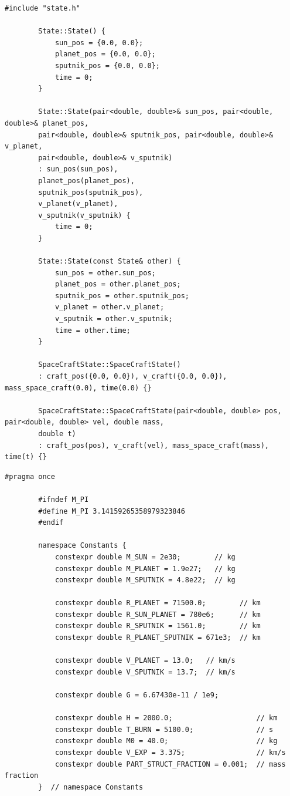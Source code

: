 \documentclass[14pt,a4paper]{extarticle}
\theoremstyle{plain}
\begin{document}
	\begin{lstlisting}[title=state.cpp, gobble=16, breaklines=true, breakatwhitespace=true]
		#include "state.h"
		
		State::State() {
			sun_pos = {0.0, 0.0};
			planet_pos = {0.0, 0.0};
			sputnik_pos = {0.0, 0.0};
			time = 0;
		}
		
		State::State(pair<double, double>& sun_pos, pair<double, double>& planet_pos,
		pair<double, double>& sputnik_pos, pair<double, double>& v_planet,
		pair<double, double>& v_sputnik)
		: sun_pos(sun_pos),
		planet_pos(planet_pos),
		sputnik_pos(sputnik_pos),
		v_planet(v_planet),
		v_sputnik(v_sputnik) {
			time = 0;
		}
		
		State::State(const State& other) {
			sun_pos = other.sun_pos;
			planet_pos = other.planet_pos;
			sputnik_pos = other.sputnik_pos;
			v_planet = other.v_planet;
			v_sputnik = other.v_sputnik;
			time = other.time;
		}
		
		SpaceCraftState::SpaceCraftState()
		: craft_pos({0.0, 0.0}), v_craft({0.0, 0.0}), mass_space_craft(0.0), time(0.0) {}
		
		SpaceCraftState::SpaceCraftState(pair<double, double> pos, pair<double, double> vel, double mass,
		double t)
		: craft_pos(pos), v_craft(vel), mass_space_craft(mass), time(t) {}
	\end{lstlisting}
	
	\begin{lstlisting}[title=consts.cpp, gobble=16, breaklines=true, breakatwhitespace=true]
		#pragma once
		
		#ifndef M_PI
		#define M_PI 3.14159265358979323846
		#endif
		
		namespace Constants {
			constexpr double M_SUN = 2e30;        // kg
			constexpr double M_PLANET = 1.9e27;   // kg
			constexpr double M_SPUTNIK = 4.8e22;  // kg
			
			constexpr double R_PLANET = 71500.0;        // km
			constexpr double R_SUN_PLANET = 780e6;      // km
			constexpr double R_SPUTNIK = 1561.0;        // km
			constexpr double R_PLANET_SPUTNIK = 671e3;  // km
			
			constexpr double V_PLANET = 13.0;   // km/s
			constexpr double V_SPUTNIK = 13.7;  // km/s
			
			constexpr double G = 6.67430e-11 / 1e9;
			
			constexpr double H = 2000.0;                    // km
			constexpr double T_BURN = 5100.0;               // s
			constexpr double M0 = 40.0;                     // kg
			constexpr double V_EXP = 3.375;                 // km/s
			constexpr double PART_STRUCT_FRACTION = 0.001;  // mass fraction
		}  // namespace Constants
	\end{lstlisting}
	
\end{document}
